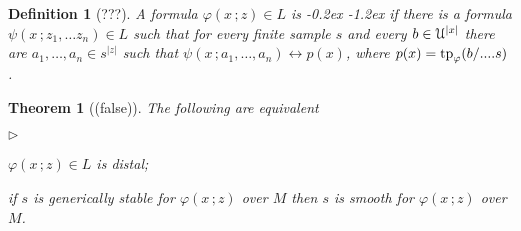 \documentclass[10pt,openany]{article}
\newcommand{\mylabel}[1]{{\ssf{#1}}\hfill}
\renewenvironment{itemize}
  {\begin{list}{$\triangleright$}{%
   \setlength{\parskip}{0mm}
   \setlength{\topsep}{.4\baselineskip}
   \setlength{\rightmargin}{0mm}
   \setlength{\listparindent}{0mm}
   \setlength{\itemindent}{0mm}
   \setlength{\labelwidth}{3ex}
   \setlength{\itemsep}{.4\baselineskip}
   \setlength{\parsep}{0mm}
   \setlength{\partopsep}{0mm}
   \setlength{\labelsep}{1ex}
   \setlength{\leftmargin}{\labelwidth+\labelsep}
   \let\makelabel\mylabel}}{%
   \end{list}\vspace*{-\parskip}}
\def\tp{{\rm tp}}
\def\iff{\leftrightarrow}
\def\U{\EuScript U}
\def\phi{\varphi}
\def\ssf#1{\textsf{\small #1}}
\newcounter{thm}[section]
\theoremstyle{mio}
\newtheorem{theorem}[thm]{Theorem}
\newtheorem{definition}[thm]{Definition}
\theoremstyle{liscio}
\def\QED{\noindent\nolinebreak[4]\hspace{\stretch{1}}\rlap{\ \ $\Box$}\medskip}
\renewcommand*{\emph}[1]{%
   \kern-0.2ex 
   \smash{\tikz[baseline]
   \node[ rectangle, fill=emphcolor, rounded corners, 
          inner xsep=.3ex, inner ysep=.2ex, anchor=base,
          minimum height = 3ex
         ]{#1};
   }
   \kern-1.2ex 
}
\begin{document}
\begin{definition}[???]
  A formula $\phi(x\,;z)\in L$ is \emph{distal\/} if there is a formula $\psi(x\,;z_1,\dots z_n)\in L$ such that for every finite sample $s$ and every $b\in\U^{|x|}$ there are $a_1,\dots,a_n\in s^{|z|}$ such that $\psi(x\,;a_1,\dots,a_n)\iff p(x)$, where $p(x)=\tp_\phi(b/....s)$.\QED
\end{definition}

\begin{theorem}[(false)]
  The following are equivalent
  \begin{itemize}
    \item[1.] $\phi(x\,;z)\in L$ is distal;
    \item[2.] if $s$ is generically stable for $\phi(x\,;z)$ over $M$ then $s$ is smooth for $\phi(x\,;z)$ over $M$.
  \end{itemize}
\end{theorem}
\end{document}
